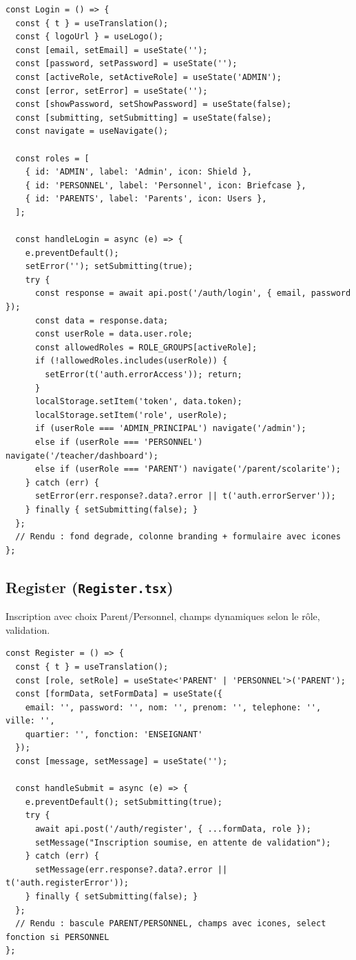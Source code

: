 \documentclass[12pt,a4paper]{article}
\begin{document}
\begin{lstlisting}[style=code]
const Login = () => {
  const { t } = useTranslation();
  const { logoUrl } = useLogo();
  const [email, setEmail] = useState('');
  const [password, setPassword] = useState('');
  const [activeRole, setActiveRole] = useState('ADMIN');
  const [error, setError] = useState('');
  const [showPassword, setShowPassword] = useState(false);
  const [submitting, setSubmitting] = useState(false);
  const navigate = useNavigate();

  const roles = [
    { id: 'ADMIN', label: 'Admin', icon: Shield },
    { id: 'PERSONNEL', label: 'Personnel', icon: Briefcase },
    { id: 'PARENTS', label: 'Parents', icon: Users },
  ];

  const handleLogin = async (e) => {
    e.preventDefault();
    setError(''); setSubmitting(true);
    try {
      const response = await api.post('/auth/login', { email, password });
      const data = response.data;
      const userRole = data.user.role;
      const allowedRoles = ROLE_GROUPS[activeRole];
      if (!allowedRoles.includes(userRole)) {
        setError(t('auth.errorAccess')); return;
      }
      localStorage.setItem('token', data.token);
      localStorage.setItem('role', userRole);
      if (userRole === 'ADMIN_PRINCIPAL') navigate('/admin');
      else if (userRole === 'PERSONNEL') navigate('/teacher/dashboard');
      else if (userRole === 'PARENT') navigate('/parent/scolarite');
    } catch (err) {
      setError(err.response?.data?.error || t('auth.errorServer'));
    } finally { setSubmitting(false); }
  };
  // Rendu : fond degrade, colonne branding + formulaire avec icones
};
\end{lstlisting}

\subsection{Register (\texttt{Register.tsx})}

Inscription avec choix Parent/Personnel, champs dynamiques selon le rôle, validation.

\begin{lstlisting}[style=code]
const Register = () => {
  const { t } = useTranslation();
  const [role, setRole] = useState<'PARENT' | 'PERSONNEL'>('PARENT');
  const [formData, setFormData] = useState({
    email: '', password: '', nom: '', prenom: '', telephone: '', ville: '',
    quartier: '', fonction: 'ENSEIGNANT'
  });
  const [message, setMessage] = useState('');

  const handleSubmit = async (e) => {
    e.preventDefault(); setSubmitting(true);
    try {
      await api.post('/auth/register', { ...formData, role });
      setMessage("Inscription soumise, en attente de validation");
    } catch (err) {
      setMessage(err.response?.data?.error || t('auth.registerError'));
    } finally { setSubmitting(false); }
  };
  // Rendu : bascule PARENT/PERSONNEL, champs avec icones, select fonction si PERSONNEL
};
\end{lstlisting}
\end{document}
